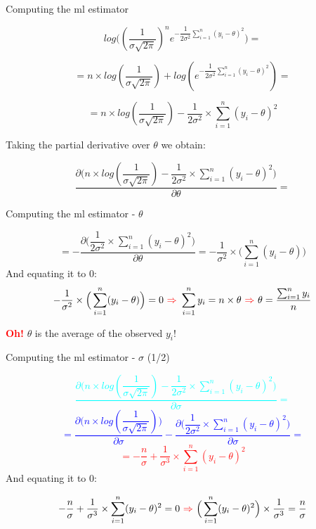 \documentclass{beamer}
\begin{document}
\begin{frame}
{\centerline{Computing the ml estimator }}

$$log\big((\dfrac 1 {\sigma \sqrt{2 \pi} } )^{n} e^{-   \dfrac { 1 } {2 \sigma^2} \sum_{i=1}^n  ({y_i - \theta})^2} ) =$$

$$= n \times log (\dfrac 1 {\sigma \sqrt{2 \pi} }) + log(e^{ - \dfrac { 1 } {2 \sigma^2} \sum_{i=1}^n  ({y_i - \theta})^2}) =$$

$$= n \times log (\dfrac 1 {\sigma \sqrt{2 \pi} }) - \dfrac { 1 } {2 \sigma^2} \times \sum_{i=1}^n  ({y_i - \theta})^2 $$

Taking the partial derivative over $\theta$ we obtain: 

$$\frac{\partial \Big(n \times log (\dfrac 1 {\sigma \sqrt{2 \pi} }) - \dfrac { 1 } {2 \sigma^2} \times \sum_{i=1}^n  ({y_i - \theta})^2 \Big)}{\partial \theta} = $$


\end{frame}

\begin{frame}
{\centerline{Computing the ml estimator - $\theta$}}

$$ = - \frac{\partial \Big( \dfrac { 1 } {2 \sigma^2} \times \sum_{i=1}^n  ({y_i - \theta})^2 \Big)}{\partial \theta} = - \dfrac { 1 } {\sigma^2} \times \Big( \sum_{i=1}^n  ({y_i - \theta}) \Big) $$
And equating it to 0:
$$ - \dfrac { 1 } {\sigma^2} \times \Big( \sum_{i=1}^n  ({y_i - \theta}) \Big) = 0 ~\textcolor{red}{\Rightarrow}~
 \sum_{i=1}^n y_i = n \times \theta 
~\textcolor{red}{\Rightarrow}~
 \theta = \frac {\sum_{i=1}^n y_i} n  $$
 
\textcolor{red}{\bf Oh!} $\theta$ is the average of the observed $y_i$!

\end{frame}

\begin{frame}
{\centerline{Computing the ml estimator - $\sigma$ (1/2)}}
\textcolor{cyan}{
$$\frac{\partial \Big(n \times log (\dfrac 1 {\sigma \sqrt{2 \pi} }) - \dfrac { 1 } {2 \sigma^2} \times \sum_{i=1}^n  ({y_i - \theta})^2 \Big)}{\partial \sigma} = $$
}\textcolor{blue}{
$$ = \frac{\partial\Big( n \times log (\dfrac 1 {\sigma \sqrt{2 \pi} })\Big) }{\partial \sigma} - \frac{\partial \Big( \dfrac { 1 } {2 \sigma^2} \times \sum_{i=1}^n  ({y_i - \theta})^2 \Big)}{\partial \sigma} = $$
}\textcolor{red}{
$$  = - \frac n {\sigma} + \frac 1 {\sigma^3} \times \sum_{i=1}^n  ({y_i - \theta})^2$$
}
And equating it to 0:

$$ 
- \frac n {\sigma} + \frac 1 {\sigma^3} \times \sum_{i=1}^n  ({y_i - \theta})^2 = 0 
~\textcolor{red}{\Rightarrow}~
 \Big(\sum_{i=1}^n  ({y_i - \theta})^2 \Big) \times  \frac 1 {\sigma^3} = \frac n {\sigma} 
$$

\end{frame}
\end{document}
